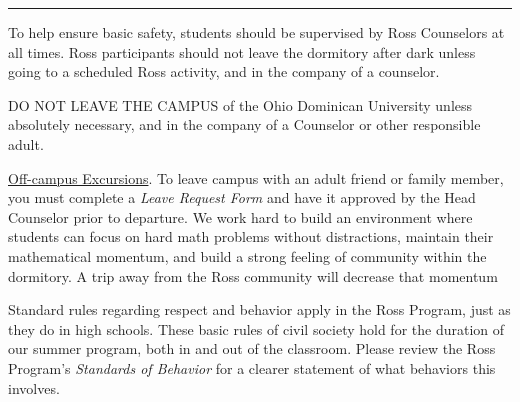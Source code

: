\documentclass{ross}
\begin{document}
\bigskip\hrule
\pagebreak

To help ensure basic safety, students should be supervised 
by Ross Counselors at all times.
Ross participants should not leave the dormitory after dark unless going to a
scheduled Ross activity, and in the company of a counselor.

DO NOT LEAVE THE CAMPUS of the Ohio Dominican University unless \\
absolutely necessary, and in the company of a Counselor or other responsible adult.  

\underline{Off-campus Excursions}.  To leave campus with
an adult friend or family member, you must complete a {\it Leave Request Form} 
and have it approved by the Head Counselor prior to departure.
We work hard to build an environment where students can focus on hard math problems
without distractions, maintain their mathematical momentum,
 and build a strong feeling of community within the dormitory.  
 A trip away from the Ross community will decrease that momentum

\bigskip

Standard rules regarding respect and behavior apply in the Ross
Program, just as they do in high schools. These basic rules of civil society hold 
for the duration of our summer program, both in and out of the classroom. 
Please review the Ross Program's \textit{Standards of Behavior} for
a clearer statement of what behaviors this involves.
\end{document}
